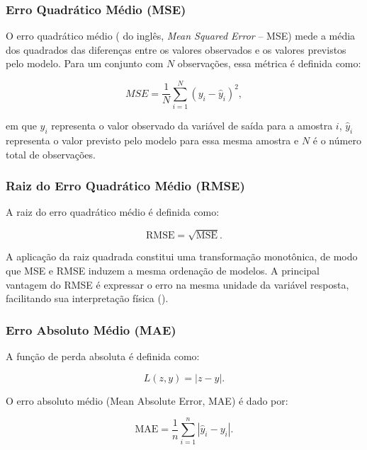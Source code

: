 \subsubsection{Erro Quadrático Médio (MSE)}

O erro quadrático médio ( do inglês, \textit{Mean Squared Error} -- MSE) mede a média dos quadrados das diferenças entre os valores observados e os valores previstos pelo modelo. Para um conjunto com \(N\) observações, essa métrica é definida como:

\begin{equation}
MSE = \frac{1}{N}\sum_{i=1}^{N}(y_i - \hat{y}_i)^2,
\end{equation}

\noindent em que \(y_i\) representa o valor observado da variável de saída para a amostra \(i\), \(\hat{y}_i\) representa o valor previsto pelo modelo para essa mesma amostra e \(N\) é o número total de observações.
\subsubsection*{Raiz do Erro Quadrático Médio (RMSE)}

A raiz do erro quadrático médio é definida como:

\begin{equation}
\mathrm{RMSE} = \sqrt{\mathrm{MSE}}.
\end{equation}

A aplicação da raiz quadrada constitui uma transformação monotônica, de modo que MSE e RMSE induzem a mesma ordenação de modelos. A principal vantagem do RMSE é expressar o erro na mesma unidade da variável resposta, facilitando sua interpretação física (\cite{Fissler2022ModelComparison}).

\subsubsection*{Erro Absoluto Médio (MAE)}

A função de perda absoluta é definida como:

\begin{equation}
L(z,y) = |z - y|.
\end{equation}

O erro absoluto médio (Mean Absolute Error, MAE) é dado por:

\begin{equation}
\mathrm{MAE} = \frac{1}{n} \sum_{i=1}^{n} |\hat{y}_i - y_i|.
\end{equation}

